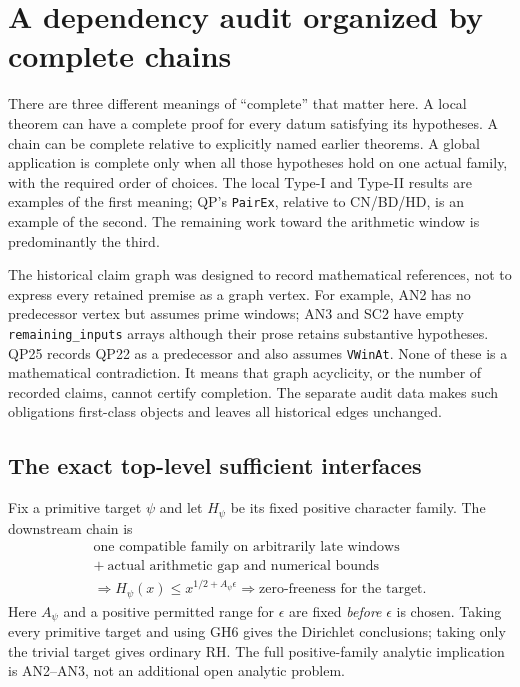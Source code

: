 \section{A dependency audit organized by complete chains}
\label{sec:dependency-audit}


There are three different meanings of ``complete'' that matter here.
A local theorem can have a complete proof for every datum satisfying its
hypotheses.  A chain can be complete relative to explicitly named earlier
theorems.  A global application is complete only when all those hypotheses
hold on one actual family, with the required order of choices.  The local
Type-I and Type-II results are examples of the first meaning; QP's
\texttt{PairEx}, relative to CN/BD/HD, is an example of the second.
The remaining work toward the arithmetic window is predominantly the third.

The historical claim graph was designed to record mathematical references,
not to express every retained premise as a graph vertex.  For example,
AN2 has no predecessor vertex but assumes prime windows; AN3 and SC2 have
empty \texttt{remaining\_inputs} arrays although their prose retains
substantive hypotheses.  QP25 records QP22 as a predecessor and also
assumes \texttt{VWinAt}.  None of these is a mathematical contradiction.
It means that graph acyclicity, or the number of recorded claims, cannot
certify completion.  The separate audit data makes such obligations
first-class objects and leaves all historical edges unchanged.

\subsection{The exact top-level sufficient interfaces}

Fix a primitive target $\psi$ and let $H_\psi$ be its fixed positive
character family.  The downstream chain is
\[
 \begin{gathered}
 \text{one compatible family on arbitrarily late windows}\\
 +\ \text{actual arithmetic gap and numerical bounds}\\
 \Longrightarrow H_\psi(x)\le x^{1/2+A_\psi\epsilon}
 \Longrightarrow \text{zero-freeness for the target}.
 \end{gathered}                                                    \tag{DA.1}
\]
Here $A_\psi$ and a positive permitted range for $\epsilon$ are fixed
\emph{before} $\epsilon$ is chosen.  Taking every primitive target and
using GH6 gives the Dirichlet conclusions; taking only the trivial target
gives ordinary RH.  The full positive-family analytic implication is
AN2--AN3, not an additional open analytic problem.

